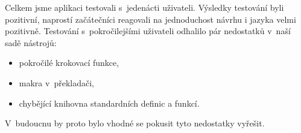 Celkem jsme aplikaci testovali s~jedenácti uživateli. Výsledky testování byli pozitivní, naprostí začátečníci reagovali na jednoduchost návrhu i jazyka velmi pozitivně. Testování s~pokročilejšími uživateli odhalilo pár nedostatků v~naší sadě nástrojů:

\begin{itemize}
	\item pokročilé krokovací funkce,
	\item makra v~překladači,
	\item chybějící knihovna standardních definic a funkcí.
\end{itemize}

V~budoucnu by proto bylo vhodné se pokusit tyto nedostatky vyřešit.